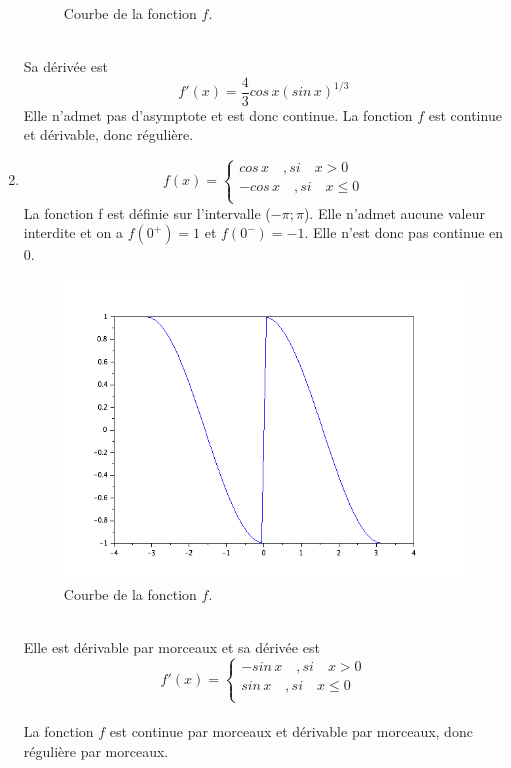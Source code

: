 \documentclass[a4paper,12pt]{report}
\begin{document}
\begin{enumerate}
\begin{figure}[h!]
		\caption{\label{figure2}Courbe de la fonction $f$.}
		\end{figure}
		\\
	Sa d\'eriv\'ee est \[f'(x)=\frac{4}{3} cos\,x (sin\,x)^{1/3}\] Elle n'admet pas d'asymptote et est donc continue.
	La fonction $f$ est continue et d\'erivable, donc r\'eguli\`ere.
	\newpage
	\item \[f(x)=
  \left\{
      \begin{aligned}
        cos\,x\quad , si\quad x > 0\\
        -cos\,x\quad ,si\quad x \le 0\\
      \end{aligned}
    \right.\]
	La fonction f est définie sur l'intervalle ($-\pi;\pi$). Elle n'admet aucune valeur interdite et on a $f(0^+)=1$ et $f(0^-)=-1$. Elle n'est donc pas continue en 0.
	\begin{figure}[h!]
		\centering
		\includegraphics[scale=0.6]{ex2_fig3.png}
		\caption{\label{figure3}Courbe de la fonction $f$.}
		\end{figure}
		\\
	Elle est d\'erivable par morceaux et sa d\'eriv\'ee est \[f'(x)=
  \left\{
      \begin{aligned}
        -sin\,x\quad , si\quad x > 0\\
        sin\,x\quad ,si\quad x \le 0\\
      \end{aligned}
    \right.\] \\
	La fonction $f$ est continue par morceaux et d\'erivable par morceaux, donc r\'eguli\`ere par morceaux.
	\newpage

\end{enumerate}
\end{document}
